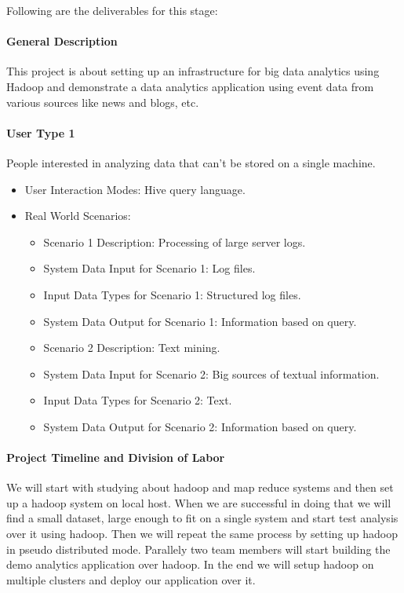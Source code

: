 Following are the deliverables for this stage:

\paragraph{General Description}
This project is about setting up an infrastructure for big data analytics using
Hadoop and demonstrate a data analytics application using event data from
various sources like news and blogs, etc. 

\paragraph{User Type 1}

People interested in analyzing data that can't be stored on a single machine.

\begin{itemize}
\item User Interaction Modes: Hive query language.
\item Real World Scenarios:
  \begin{itemize}
  \item Scenario 1 Description: Processing of large server logs.
  \item System Data Input for Scenario 1: Log files.
  \item Input Data Types for Scenario 1: Structured log files.
  \item System Data Output for Scenario 1: Information based on query.
  \item Scenario 2 Description: Text mining.
  \item System Data Input for Scenario 2: Big sources of textual information.
  \item Input Data Types for Scenario 2: Text.
  \item System Data Output for Scenario 2: Information based on query.
  \end{itemize}
\end{itemize}

\paragraph{Project Timeline and Division of Labor}

We will start with studying about hadoop and map reduce systems and then  set
up a hadoop system on local host. When we are successful in doing that we will
find a small dataset, large enough to fit on a single system and start test
analysis over it using hadoop. Then we will repeat the same process by setting
up hadoop in pseudo distributed mode. Parallely two team members will start
building the demo analytics application over hadoop. In the end we will setup
hadoop on multiple clusters and deploy our application over it.


